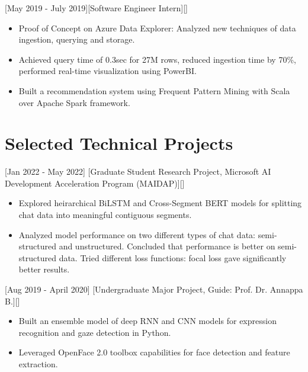 \documentclass{article}
\begin{document}
[May 2019 - July 2019][Software Engineer Intern][]

\begin{itemize}
\item Proof of Concept on Azure Data Explorer: Analyzed new techniques of data ingestion, querying and storage. 
\item Achieved query time of 0.3sec for 27M rows, reduced ingestion time by 70\%, performed real-time visualization using PowerBI.
\item Built a recommendation system using Frequent Pattern Mining with Scala over Apache Spark framework.

\end{itemize}





\section{Selected Technical Projects}

[Jan 2022 - May 2022]
[Graduate Student Research Project, Microsoft AI Development Acceleration Program (MAIDAP)][]
\begin{itemize}
\item Explored heirarchical BiLSTM and Cross-Segment BERT models for splitting chat data into meaningful contiguous segments.
\item Analyzed model performance on two different types of chat data: semi-structured and unstructured. Concluded that performance is better on semi-structured data. Tried different loss functions: focal loss gave significantly better results.
\end{itemize}

[Aug 2019 - April 2020]
[Undergraduate Major Project, Guide: Prof. Dr. Annappa B.][]
\begin{itemize}
\item Built an ensemble model of deep RNN and CNN models for expression recognition and gaze detection in Python.
\item Leveraged OpenFace 2.0 toolbox capabilities for face detection and feature extraction.
\end{itemize}
\end{document}

